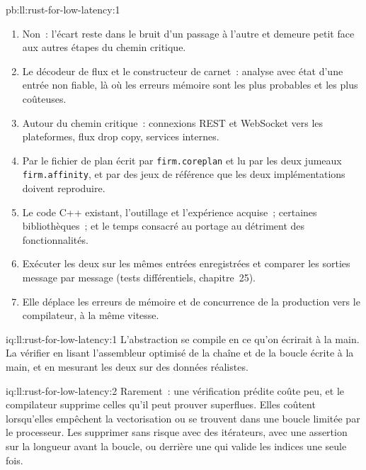 \begin{solution}{pb:ll:rust-for-low-latency:1}
\begin{enumerate}
(un écart d'un cinquième au plus d'un passage à l'autre)~; les ébauches allouent cinq fois (Rust) et neuf fois (C++) par message, les gestionnaires
corrigés n'allouent jamais.
\item Non~: l'écart reste dans le bruit d'un passage à l'autre et demeure petit face aux autres étapes du chemin critique.
\item Le décodeur de flux et le constructeur de carnet~: analyse avec état d'une entrée non fiable, là où les erreurs mémoire sont les plus probables et les plus
coûteuses.
\item Autour du chemin critique~: connexions REST et WebSocket vers les plateformes, flux drop copy, services internes.
\item Par le fichier de plan écrit par \texttt{firm.coreplan} et lu par les deux jumeaux \texttt{firm.affinity}, et par des
jeux de référence que les deux implémentations doivent reproduire.
\item Le code C++ existant, l'outillage et l'expérience acquise~; certaines bibliothèques~; et le temps consacré au portage au détriment des fonctionnalités.
\item Exécuter les deux sur les mêmes entrées enregistrées et comparer les sorties message par message (tests différentiels, chapitre~25).
\item Elle déplace les erreurs de mémoire et de concurrence de la production vers le compilateur, à la même vitesse.
\end{enumerate}
\end{solution}

\begin{solution}{iq:ll:rust-for-low-latency:1}
L'abstraction se compile en ce qu'on écrirait à la main. La vérifier en lisant l'assembleur optimisé de la chaîne et de la
boucle écrite à la main, et en mesurant les deux sur des données réalistes.
\end{solution}

\begin{solution}{iq:ll:rust-for-low-latency:2}
Rarement~: une vérification prédite coûte peu, et le compilateur supprime celles qu'il peut prouver superflues. Elles coûtent
lorsqu'elles empêchent la vectorisation ou se trouvent dans une boucle limitée par le processeur. Les supprimer sans risque avec
des itérateurs, avec une assertion sur la longueur avant la boucle, ou derrière une  qui valide les indices une seule fois.
\end{solution}

